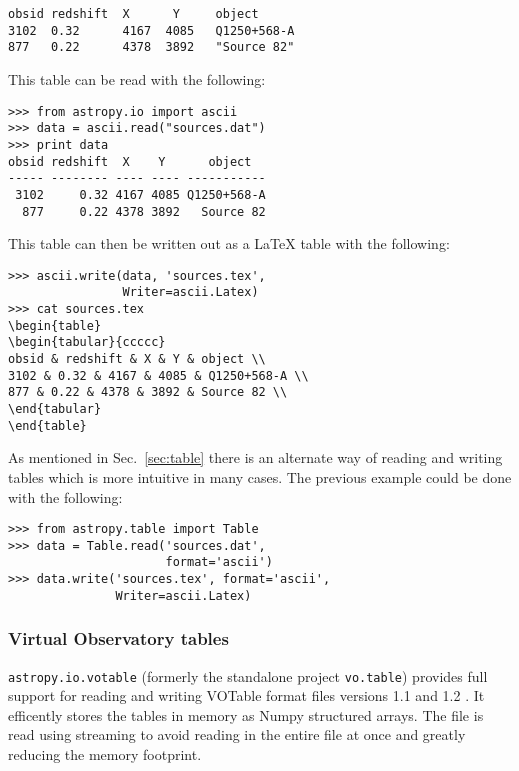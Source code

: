 \documentclass[traditabstract]{aa}
\begin{document}
\begin{verbatim}
obsid redshift  X      Y     object
3102  0.32      4167  4085   Q1250+568-A
877   0.22      4378  3892   "Source 82"
\end{verbatim}

This table can be read with the following:

\begin{verbatim}
>>> from astropy.io import ascii
>>> data = ascii.read("sources.dat")
>>> print data
obsid redshift  X    Y      object
----- -------- ---- ---- -----------
 3102     0.32 4167 4085 Q1250+568-A
  877     0.22 4378 3892   Source 82
\end{verbatim}

This table can then be written out as a LaTeX table with the following:

\begin{verbatim}
>>> ascii.write(data, 'sources.tex',
                Writer=ascii.Latex)
>>> cat sources.tex
\begin{table}
\begin{tabular}{ccccc}
obsid & redshift & X & Y & object \\
3102 & 0.32 & 4167 & 4085 & Q1250+568-A \\
877 & 0.22 & 4378 & 3892 & Source 82 \\
\end{tabular}
\end{table}
\end{verbatim}

As mentioned in Sec.~\ref{sec:table} there is an alternate way of
reading and writing tables which is more intuitive in many cases.
The previous example could be done with the following:

\begin{verbatim}
>>> from astropy.table import Table
>>> data = Table.read('sources.dat',
                      format='ascii')
>>> data.write('sources.tex', format='ascii',
               Writer=ascii.Latex)
\end{verbatim}

\subsubsection{Virtual Observatory tables}

\texttt{astropy.io.votable} (formerly the standalone project
\texttt{vo.table}) provides full support for reading and writing
VOTable format files versions 1.1 and 1.2
\citep{ochsenbein2004votable,ochsenbein2009votable}.  It efficently
stores the tables in memory as Numpy structured arrays.  The file is
read using streaming to avoid reading in the entire file at once and
greatly reducing the memory footprint.
\end{document}
